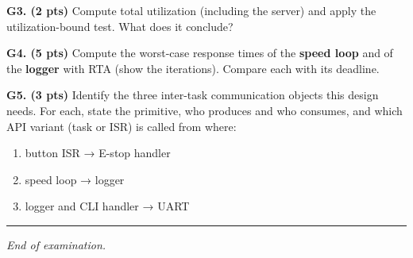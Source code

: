\documentclass[
  11pt,
]{article}
\providecommand{\tightlist}{%
  \setlength{\itemsep}{0pt}\setlength{\parskip}{0pt}}
\begin{document}
\textbf{G3. (2 pts)} Compute total utilization (including the server)
and apply the utilization-bound test. What does it conclude?

\textbf{G4. (5 pts)} Compute the worst-case response times of the
\textbf{speed loop} and of the \textbf{logger} with RTA (show the
iterations). Compare each with its deadline.

\textbf{G5. (3 pts)} Identify the three inter-task communication objects
this design needs. For each, state the primitive, who produces and who
consumes, and which API variant (task or ISR) is called from where:

\begin{enumerate}
\def\labelenumi{\alph{enumi}.}
\tightlist
\item
  button ISR → E-stop handler
\item
  speed loop → logger
\item
  logger and CLI handler → UART
\end{enumerate}

\begin{center}\rule{0.5\linewidth}{0.5pt}\end{center}

\emph{End of examination.}
\end{document}

